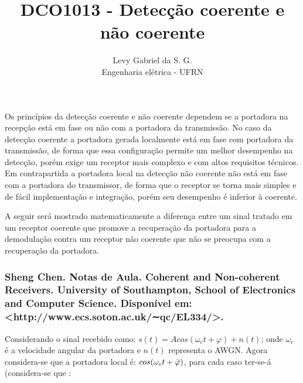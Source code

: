\title{DCO1013 - Detecção coerente e não coerente}
\author{Levy Gabriel da S. G. \\ Engenharia elétrica - UFRN}

\maketitle
\thispagestyle{fancy}


Os princípios da detecção coerente e não coerente dependem se a portadora na recepção está em fase ou não com a portadora da transmissão. No caso da detecção coerente a portadora gerada localmente está em fase com portadora da transmissão, de forma que essa configuração permite um melhor desempenho na detecção, porém exige um receptor mais complexo e com altos requisitos técnicos. Em contrapartida a portadora local na detecção não coerente não está em fase com a portadora do transmissor, de forma que o receptor se torna mais simples e de fácil implementação e integração, porém seu desempenho é inferior à coerente. 

A seguir será mostrado matematicamente a diferença entre um sinal tratado em um receptor coerente que promove a recuperação da portadora para a demodulação contra um receptor não coerente que não se preocupa com a recuperação da portadora.

\subsubsection*{Sheng Chen. Notas de Aula. Coherent and Non-coherent Receivers. University of Southampton, School of Electronics and Computer Science. Disponível em: <http://www.ecs.soton.ac.uk/∼qc/EL334/>.}

Considerando o sinal recebido como: $s(t) = A cos(\omega_c t + \varphi) + n(t)$; onde $\omega_c$ é a velocidade angular da portadora e $n(t)$ representa o AWGN. Agora considera-se que a portadora local é: $cos(\omega_c t+ \Bar{\varphi})$, para cada caso ter-se-á (considera-se que :

